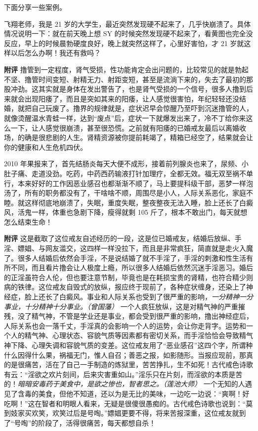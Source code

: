 下面分享一些案例。

\begin{case}
    飞翔老师，我是 21 岁的大学生，最近突然发现硬不起来了，几乎快崩溃了。具体情况说明一下：就在前天晚上想 SY 的时候突然发现硬不起来了，看黄图也完全没反应，早上的时候晨勃硬度良好，晚上就突然这样了，心里好害怕，才 21 岁就这样以后怎么办啊！我还有救吗？

    \textbf{附评} 撸管到一定程度，肾气受损，性功能肯定会出问题的，比较常见的就是勃起不坚、撸管时间变短、射精无力、射距变短，甚至是流淌下来的，失去了最初的那股冲劲。这其实就是身体在发出警告了，也是肾气受损的一个信号，很多人撸到后来就会出现阳痿了，而且是突如其来的阳痿，让人感觉很害怕，年纪轻轻还没结婚，就把自己玩废了。撸界的规律就是，症状迟早会惊醒乃至吓到沉迷撸管的人，就像烫醒温水青蛙一样，达到“废点”后，症状一下就爆发出来了，冷不丁给你来这么一下，让人感觉很崩溃，甚至很恐慌。之前就有阳痿的已婚戒友最后以离婚收场，的确是很悲剧的人生。肾精资源被你提前耗竭了，精箱已经空了，结果就会让你的健康和人生危机四伏。
\end{case}

\begin{case}
    2010 年果报来了，首先结肠炎每天大便不成形，接着前列腺炎也来了，尿频、小肚子痛、走道没劲。吃药，中药西药输液打针加理疗，全都无效。福无双至祸不单行，本来好好的工作因恶业感召也都渐渐不顺了，马上要提科级干部，恶梦一样泡汤了，所有的职务都没有了，干啥啥不顺，周围尽是小人，人际关系恶化，家庭不睦。就这样彻底地崩溃了，失眠，重度失眠，整夜整夜无法入睡，脸上还长了白癜风，活鬼一样，体重也急剧下降，瘦得就剩 105 斤了，根本不敢出门，每天就想怎么结束生命！

    \textbf{附评} 这是截取了这位戒友自述经历的一段，这是位已婚戒友，结婚后放纵、手淫、嫖娼、与网友滥交，这四样一样没拉下，而且是非常疯狂，简直就是走火入魔了。很多人结婚后依然会手淫，不是说结婚了就不手淫了，手淫的刺激和性生活有所不同，而且看片撸会让人极度上瘾，所以很多人结婚后依然沉迷手淫恶习。婚后的正淫虽符合人伦，但也要注意节制，毕竟也是在耗损宝贵的肾精，也符合精少则病的铁律。这位戒友自毁式的放纵，报应终于现前了，各种症状缠身，还染上了神经症，脸上还长了白癜风。事业和人际关系也受到了很严重的影响，\textit{一分精神一分事业，十分精神十分事业。（曾国藩）} 一个人疯狂放纵，这是对精气神的严重摧残，没了精气神，不管是学业还是事业，都会受到很严重的影响，撸出神经症后，人际关系也会一落千丈，手淫真的会影响一个人的运势，会让你走背字。运势和一个人的精气神、心理状态、容貌气质等因素都有密切关系，而手淫恰恰会导致精气神下降、心理失调和容貌气质的变差。这位戒友用了“恶业感召”这四个字，所谓种什么因得什么果，祸福无门，惟人自召；善恶之报，如影随形。当报应现前，那真的是很痛苦，活在了自己一手制造的炼狱里，苦苦挣扎，生不如死！古代戒色诗歌有云：“淫欲之欢片刻间，后来灾害重如山。”淫乐只在片刻，而淫欲的本质是苦的！\textit{暗暗安毒药于美食中，是欲之惨也，智者思之。（莲池大师）} 一个无知的人遇见了含毒的美食，但他不知道，还以为是无比的美味，一边吃一边说：“爽啊！好吃啊！”这在智者和明眼人看来，无疑是很傻很愚痴的。古代戒色诗歌也说到：“莫到妓家买欢笑，欢笑过后是号啕。”嫖娼更要不得，将来苦报深重，这位戒友就到了“号啕”的阶段了，活得很痛苦，每天都想自杀！
\end{case}

